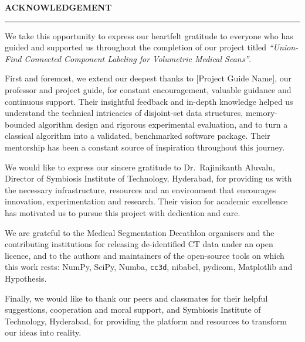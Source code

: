 \documentclass[11pt,a4paper]{article}
\newcommand{\GuideName}{[Project Guide Name]}
\newcommand{\DirectorName}{Dr.\ Rajinikanth Aluvalu}
\newcommand{\FrontHeading}[1]{%
  \begin{center}{\LARGE\bfseries\color{sitred}#1}\\[-2pt]{\color{sitred}\rule{4.2cm}{0.8pt}}\end{center}\vspace{4pt}}
\begin{document}
{}
\FrontHeading{ACKNOWLEDGEMENT}
We take this opportunity to express our heartfelt gratitude to everyone who has guided and supported us throughout the completion of our project titled \emph{``Union-Find Connected Component Labeling for Volumetric Medical Scans''}.

First and foremost, we extend our deepest thanks to \GuideName, our professor and project guide, for constant encouragement, valuable guidance and continuous support. Their insightful feedback and in-depth knowledge helped us understand the technical intricacies of disjoint-set data structures, memory-bounded algorithm design and rigorous experimental evaluation, and to turn a classical algorithm into a validated, benchmarked software package. Their mentorship has been a constant source of inspiration throughout this journey.

We would like to express our sincere gratitude to \DirectorName, Director of Symbiosis Institute of Technology, Hyderabad, for providing us with the necessary infrastructure, resources and an environment that encourages innovation, experimentation and research. Their vision for academic excellence has motivated us to pursue this project with dedication and care.

We are grateful to the Medical Segmentation Decathlon organisers and the contributing institutions for releasing de-identified CT data under an open licence, and to the authors and maintainers of the open-source tools on which this work rests: NumPy, SciPy, Numba, \texttt{cc3d}, nibabel, pydicom, Matplotlib and Hypothesis.

Finally, we would like to thank our peers and classmates for their helpful suggestions, cooperation and moral support, and Symbiosis Institute of Technology, Hyderabad, for providing the platform and resources to transform our ideas into reality.
\clearpage
\end{document}
